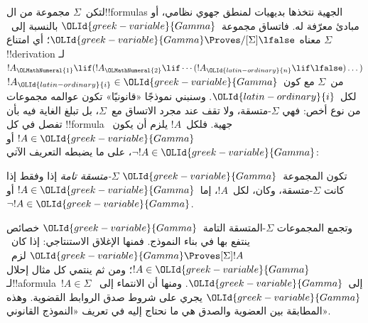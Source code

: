 \documentclass[../../../include/open-logic-section]{subfiles}
\begin{document}


لتكن~$\Sigma$ مجموعة من ال!!{formula}s الجهية نتخذها بديهيات
لمنطق جهوي نظامي، أو مبادئ معرّفة له. فاتساق مجموعة~$\OLId{greek-variable}{Gamma}$
بالنسبة إلى~$\Sigma$ معناه $\OLId{greek-variable}{Gamma} \Proves/[\Sigma] \lfalse$؛
أي امتناع !!{derivation} لـ
$!A_\OLMathNumeral{1} \lif (!A_\OLMathNumeral{2} \lif \cdots (!A_\OLId{latin-ordinary}{n} \lif \lfalse)\dots)$ من~$\Sigma$
مع كون~$!A_\OLId{latin-ordinary}{i} \in \OLId{greek-variable}{Gamma}$ لكل~$\OLId{latin-ordinary}{i}$.
وسنبني نموذجًا «قانونيًا» تكون عوالمه مجموعات من نوع أخص:
فهي $\Sigma$-متسقة، ولا تقف عند مجرد الاتساق مع~$\Sigma$،
بل تبلغ الغاية فيه بأن تفصل في كل !!{formula} جهية.
فلكل~$!A$ يلزم أن يكون~$!A \in \OLId{greek-variable}{Gamma}$ أو $\lnot !A \in \OLId{greek-variable}{Gamma}$،
على ما يضبطه التعريف الآتي:

\begin{defn}
  تكون المجموعة~$\OLId{greek-variable}{Gamma}$ \emph{$\Sigma$-متسقة تامة} إذا وفقط إذا
  كانت $\Sigma$-متسقة، وكان، لكل~$!A$، إما~$!A \in \OLId{greek-variable}{Gamma}$ أو
  $\lnot !A \in \OLId{greek-variable}{Gamma}$.
\end{defn}

وتجمع المجموعات $\Sigma$-المتسقة التامة~$\OLId{greek-variable}{Gamma}$ خصائص ينتفع بها
في بناء النموذج. فمنها الإغلاق الاستنتاجي:
إذا كان~$\OLId{greek-variable}{Gamma} \Proves[\Sigma] !A$ لزم~$!A \in \OLId{greek-variable}{Gamma}$؛
ومن ثم ينتمي كل مثال إحلال لـ!!a{formula}~$!A \in \Sigma$ إلى~$\OLId{greek-variable}{Gamma}$.
ومنها أن الانتماء إلى~$\OLId{greek-variable}{Gamma}$ يجري على شروط صدق الروابط القضوية.
وهذه المطابقة بين العضوية والصدق هي ما نحتاج إليه في تعريف
«النموذج القانوني».
\end{document}
